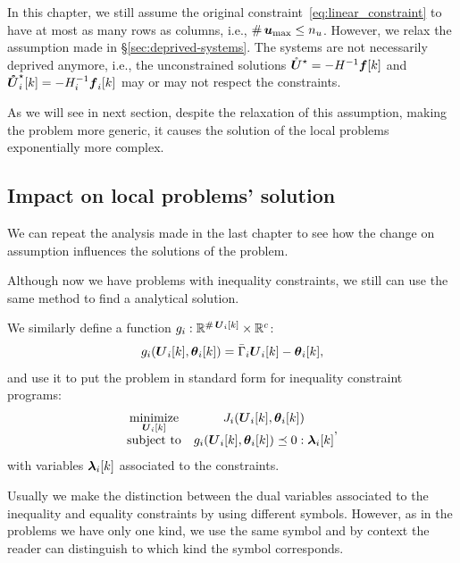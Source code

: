\documentclass[../main.tex]{subfiles}
\begin{document}
In this chapter, we still assume the original constraint~\eqref{eq:linear_constraint} to have at most as many rows as columns, i.e., $\operatorname{\#}{\boldsymbol{u}_{\max}}\leq n_{u}$.
However, we relax the assumption made in \S\ref{sec:deprived-systems}.
The systems are not necessarily deprived anymore, i.e., the unconstrained solutions
${\mathring{\boldsymbol{U}}^{\star}}=-H^{-1}\boldsymbol{f}[k]$ and $\optuncUik=-H_{i}^{-1}\vec{f}_{i}[k]$ may or may not respect the constraints.

As we will see in next section, despite the relaxation of this assumption, making the problem more generic, it causes the solution of the local problems exponentially more complex.

\subsection{Impact on local problems' solution}\label{sec:impact-local-problem}
We can repeat the analysis made in the last chapter to see how the change on assumption influences the solutions of the problem.

Although now we have \qp{} problems with inequality constraints, we still can use the same method to find a analytical solution.

We similarly define a function $g_i:\mathbb{R}^{\operatorname{\#}\boldsymbol{U}_{i}[k]}\times \mathbb{R}^{c}$:
\begin{equation}
  \label{eq:lagrangian_inequality}
  \inequalityfunction=\bar{\Gamma}_{i}\vec{U}_i[k]-\thetaik,
\end{equation}
and use it to put the problem in standard form for inequality constraint \qp{} programs:
\begin{equation}
  \begin{matrix}
    \label{eq:local_problem_equality_standard_notation}
    \minimize\limits_{\vec{U}_{i}[k]}&\obji(\vec{U}_{i}[k],\thetaik)\\
    \mathrm{subject~ to} & \inequalityfunction\preceq 0:\lambdaik
  \end{matrix},
\end{equation}
with variables $\lambdaik$ associated to the constraints.
\begin{remark}
  Usually we make the distinction between the dual variables associated to the inequality and equality constraints by using different symbols.
  However, as in the problems we have only one kind, we use the same symbol and by context the reader can distinguish to which kind the symbol corresponds.
\end{remark}
\end{document}
